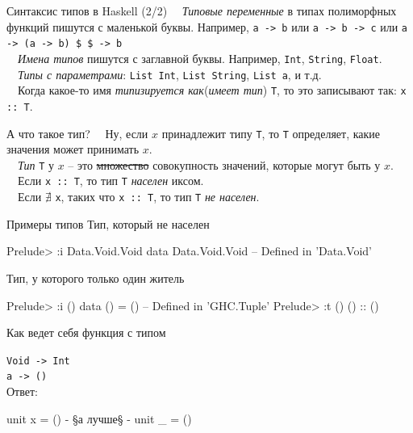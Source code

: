 \documentclass{beamer}
\newcommand{\inline}[1]{\lstinline{haskell}{#1}}
\def\hsinline{\lstinline[style={hsstyle1}]}
\def\inline{\hsinline}
\def\faQuestion{{\FA\symbol{"F128}}}
\begin{document}
\begin{frame}{Синтаксис типов в Haskell (2/2)}
~\ \emph{Типовые переменные} в типах полиморфных функций пишутся с маленькой буквы. Например, \inline{a -> b} или \inline{a -> b -> c} или 
\inline=a -> (a -> b) $ $ -> b=
\vspace{0.5cm} 
\\ \pause
~\ \emph{Имена типов} пишутся с заглавной буквы. Например,  \inline=Int=, \inline=String=, \inline=Float=.
\vspace{0.5cm} 
\\ \pause
~\ \emph{Типы с параметрами}: \inline=List Int=, \inline=List String=, \inline=List a=, и т.д. 
\vspace{0.5cm} 
\\ \pause
~\ Когда какое-то имя \emph{типизируется как}(\emph{имеет тип}) \inline=T=, то это записывают так: \inline=x :: T=.
\end{frame}

\begin{frame}[fragile]{А что такое тип?}
~\ Ну, если $x$ принадлежит типу \inline=T=, то \inline=T= определяет, какие значения может принимать $x$.
\\ \vspace{0.5cm} %
~\ \emph{Тип} \inline=T= у $x$ -- это \sout{множество} совокупность значений, которые могут быть у $x$.
\vspace{0.5cm} \\ %
~\  Если \inline=x :: T=, то тип \inline=T= \emph{населен} иксом.
\\ \vspace{0.5cm} %
~\ Если $\nexists$ \inline=x=, таких что \inline=x :: T=, то тип \inline=T= \emph{не населен}.
\end{frame}

\begin{frame}[fragile]{Примеры типов}
Тип, который не населен
\begin{hslisting}
Prelude> :i Data.Void.Void
data Data.Void.Void        -- Defined in 'Data.Void'
\end{hslisting}

Тип, у которого только один житель
\begin{hslisting}
Prelude> :i ()
data () = ()               -- Defined in 'GHC.Tuple'
Prelude> :t ()
() :: ()
\end{hslisting}
\end{frame}

\begin{frame}[fragile]{Как ведет себя функция с типом}

{\Large \faQuestion} \inline=Void -> Int= \\
\vspace{1cm}
{\large \faQuestion} \inline=a -> ()= \\
\vspace{0.5cm}
Ответ:
\begin{hslisting}
unit x = ()
{- §а лучше§ -}
unit _ = ()
\end{hslisting}
\end{frame}


\end{document}
